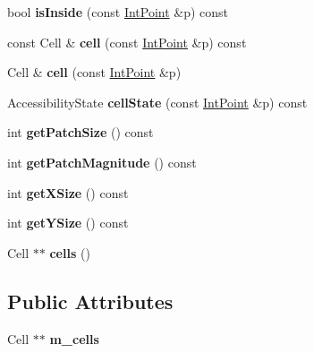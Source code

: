 \begin{DoxyCompactItemize}
\mbox{\label{classGMapping_1_1Array2D_af6b20adad6b9616ba09a5a3a9b6a5217}} 
bool {\bfseries is\+Inside} (const \hyperlink{structGMapping_1_1point}{Int\+Point} \&p) const
\item 
\mbox{\label{classGMapping_1_1Array2D_a0a273b52c2906b09294728e6bd50cdcb}} 
const Cell \& {\bfseries cell} (const \hyperlink{structGMapping_1_1point}{Int\+Point} \&p) const
\item 
\mbox{\label{classGMapping_1_1Array2D_a34638010c9abfcd70653dc6d9d3f9b62}} 
Cell \& {\bfseries cell} (const \hyperlink{structGMapping_1_1point}{Int\+Point} \&p)
\item 
\mbox{\label{classGMapping_1_1Array2D_a4c4a401989e25a1969d5d06e2e07a881}} 
Accessibility\+State {\bfseries cell\+State} (const \hyperlink{structGMapping_1_1point}{Int\+Point} \&p) const
\item 
\mbox{\label{classGMapping_1_1Array2D_ad62adb483a791ed9590e6e232d649668}} 
int {\bfseries get\+Patch\+Size} () const
\item 
\mbox{\label{classGMapping_1_1Array2D_ab0dec32b505ee0d5705ca4e524c120d3}} 
int {\bfseries get\+Patch\+Magnitude} () const
\item 
\mbox{\label{classGMapping_1_1Array2D_a415be1e44912dc2a9234ddae24d2b3c3}} 
int {\bfseries get\+X\+Size} () const
\item 
\mbox{\label{classGMapping_1_1Array2D_a9546966c70ad82ec627410e545001b6b}} 
int {\bfseries get\+Y\+Size} () const
\item 
\mbox{\label{classGMapping_1_1Array2D_a444e496469dd26c93335a737361b5915}} 
Cell $\ast$$\ast$ {\bfseries cells} ()
\end{DoxyCompactItemize}
\subsection*{Public Attributes}
\begin{DoxyCompactItemize}
\item 
\mbox{\label{classGMapping_1_1Array2D_afd83021c5123d5ae067a3ed34512a59e}} 
Cell $\ast$$\ast$ {\bfseries m\+\_\+cells}
\end{DoxyCompactItemize}
